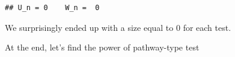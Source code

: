 \documentclass[
]{article}
\newenvironment{Shaded}{\begin{snugshade}}{\end{snugshade}}
\newcommand{\CommentTok}[1]{\textcolor[rgb]{0.56,0.35,0.01}{\textit{#1}}}
\newcommand{\KeywordTok}[1]{\textcolor[rgb]{0.13,0.29,0.53}{\textbf{#1}}}
\newcommand{\NormalTok}[1]{#1}
\newcommand{\OperatorTok}[1]{\textcolor[rgb]{0.81,0.36,0.00}{\textbf{#1}}}
\newcommand{\StringTok}[1]{\textcolor[rgb]{0.31,0.60,0.02}{#1}}
\begin{document}
\begin{Shaded}
\begin{Highlighting}[]
{\KeywordTok{cat}\NormalTok{(}\StringTok{"U_n ="}\NormalTok{, out_U}\OperatorTok{/}\NormalTok{m, }\StringTok{"   W_n = "}\NormalTok{,out_W}\OperatorTok{/}\NormalTok{m)}
\end{Highlighting}
\end{Shaded}

\begin{verbatim}
## U_n = 0    W_n =  0
\end{verbatim}

\begin{Shaded}
\end{Shaded}

We surprisingly ended up with a size equal to 0 for each test.

At the end, let's find the power of pathway-type test
\end{document}
